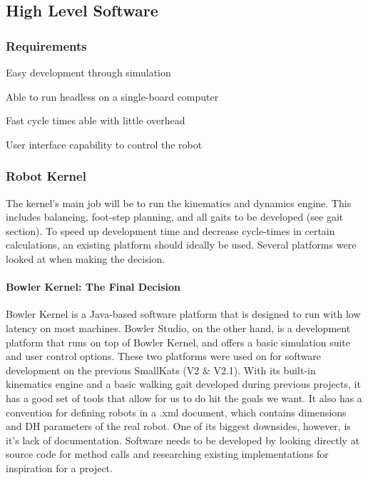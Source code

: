     \subsection{High Level Software} \label{subsec: Software}
        
        \subsubsection{Requirements}
            \begin{Deliverables}
                \item Easy development through simulation
                \item Able to run headless on a single-board computer
                \item Fast cycle times able with little overhead
                \item User interface capability to control the robot
            \end{Deliverables}
        
        \subsubsection{Robot Kernel}
            The kernel's main job will be to run the kinematics and dynamics engine. This includes balancing, foot-step planning, and all gaits to be developed (see gait section). To speed up development time and decrease cycle-times in certain calculations, an existing platform should ideally be used. Several platforms were looked at when making the decision.
            
            \paragraph*{Bowler Kernel: The Final Decision} 
                Bowler Kernel is a Java-based software platform that is designed to run with low latency on most machines. Bowler Studio, on the other hand, is a development platform that runs on top of Bowler Kernel, and offers a basic simulation suite and user control options. These two platforms were used on for software development on the previous SmallKats (V2 \& V2.1). With its built-in kinematics engine and a basic walking gait developed during previous projects, it has a good set of tools that allow for us to do hit the goals we want. It also has a convention for defining robots in a .xml document, which contains dimensions and DH parameters of the real robot. One of its biggest downsides, however, is it's lack of documentation. Software needs to be developed by looking directly at source code for method calls and researching existing implementations for inspiration for a project.
                
